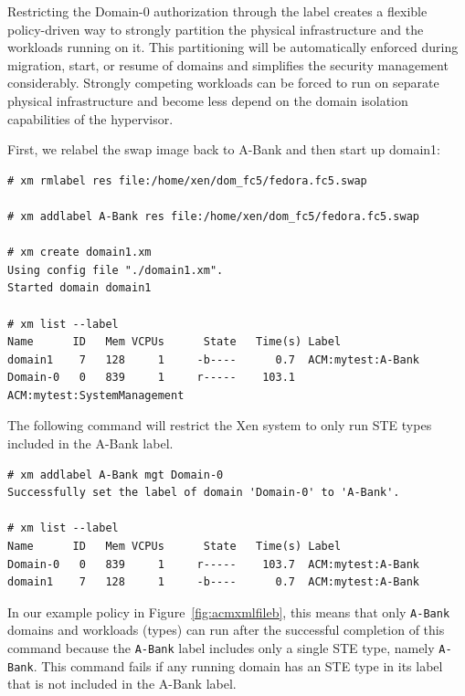 \documentclass[11pt,twoside,final,openright]{report}
\begin{document}
Restricting the Domain-0 authorization through the label creates a flexible
policy-driven way to strongly partition the physical infrastructure and the
workloads running on it. This partitioning will be automatically enforced during
migration, start, or resume of domains and simplifies the security management
considerably. Strongly competing workloads can be forced to run on separate physical
infrastructure and become less depend on the domain isolation capabilities
of the hypervisor.

First, we relabel the swap image back to A-Bank and then start up domain1:
\begin{scriptsize}
\begin{verbatim}
# xm rmlabel res file:/home/xen/dom_fc5/fedora.fc5.swap

# xm addlabel A-Bank res file:/home/xen/dom_fc5/fedora.fc5.swap

# xm create domain1.xm
Using config file "./domain1.xm".
Started domain domain1

# xm list --label
Name      ID   Mem VCPUs      State   Time(s) Label
domain1    7   128     1     -b----      0.7  ACM:mytest:A-Bank
Domain-0   0   839     1     r-----    103.1  ACM:mytest:SystemManagement
\end{verbatim}
\end{scriptsize}

The following command will restrict the Xen system to only run STE types
included in the A-Bank label.

\begin{scriptsize}
\begin{verbatim}
# xm addlabel A-Bank mgt Domain-0
Successfully set the label of domain 'Domain-0' to 'A-Bank'.

# xm list --label
Name      ID   Mem VCPUs      State   Time(s) Label
Domain-0   0   839     1     r-----    103.7  ACM:mytest:A-Bank
domain1    7   128     1     -b----      0.7  ACM:mytest:A-Bank

\end{verbatim}
\end{scriptsize}

In our example policy in Figure~\ref{fig:acmxmlfileb}, this means that
only \verb|A-Bank| domains and workloads (types) can run after the
successful completion of this command because the \verb|A-Bank| label
includes only a single STE type, namely \verb|A-Bank|. This command
fails if any running domain has an STE type in its label that is not
included in the A-Bank label.
\end{document}
